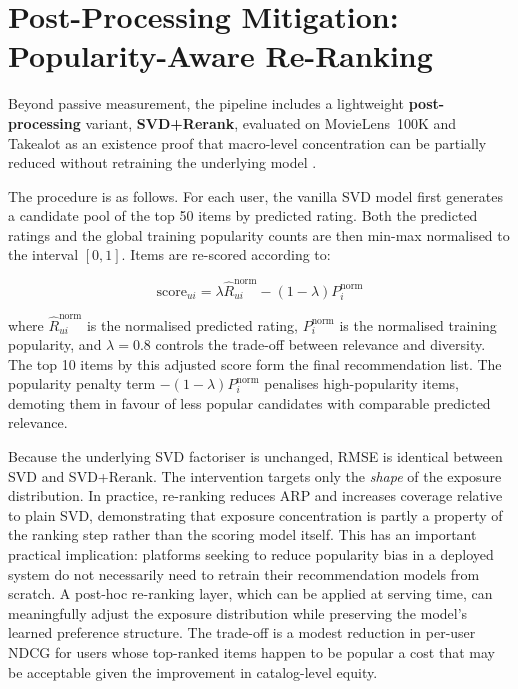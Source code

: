 \documentclass[11pt,a4paper]{report}
\begin{document}
\section{Post-Processing Mitigation: Popularity-Aware Re-Ranking}
\label{sec:expa_rerank}

Beyond passive measurement, the pipeline includes a lightweight \textbf{post-processing} variant, \textbf{SVD+Rerank}, evaluated on MovieLens~100K and Takealot as an existence proof that macro-level concentration can be partially reduced without retraining the underlying model \citep{abdollahpouri2019managing}.

The procedure is as follows. For each user, the vanilla SVD model first generates a candidate pool of the top 50 items by predicted rating. Both the predicted ratings and the global training popularity counts are then min-max normalised to the interval $[0,1]$. Items are re-scored according to:

\begin{equation}
\text{score}_{ui} = \lambda \hat{R}_{ui}^{\text{norm}} - (1-\lambda) P_i^{\text{norm}}
\end{equation}

where $\hat{R}_{ui}^{\text{norm}}$ is the normalised predicted rating, $P_i^{\text{norm}}$ is the normalised training popularity, and $\lambda = 0.8$ controls the trade-off between relevance and diversity. The top 10 items by this adjusted score form the final recommendation list. The popularity penalty term $-(1-\lambda) P_i^{\text{norm}}$ penalises high-popularity items, demoting them in favour of less popular candidates with comparable predicted relevance.

Because the underlying SVD factoriser is unchanged, RMSE is identical between SVD and SVD+Rerank. The intervention targets only the \emph{shape} of the exposure distribution. In practice, re-ranking reduces ARP and increases coverage relative to plain SVD, demonstrating that exposure concentration is partly a property of the ranking step rather than the scoring model itself. This has an important practical implication: platforms seeking to reduce popularity bias in a deployed system do not necessarily need to retrain their recommendation models from scratch. A post-hoc re-ranking layer, which can be applied at serving time, can meaningfully adjust the exposure distribution while preserving the model's learned preference structure. The trade-off is a modest reduction in per-user NDCG for users whose top-ranked items happen to be popular a cost that may be acceptable given the improvement in catalog-level equity.
\end{document}
